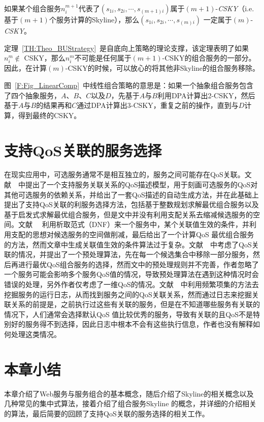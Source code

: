 \begin{theorem}[自底向上策略]\label{TH:Theo_BUStrategy}
如果某个组合服务$n_{i}^{m+1}$代表了$(s_{1i},s_{2i},\cdots,s_{(m+1)i})$属于$(m+1)$-\emph{CSKY}（i.e. 基于$(m+1)$个服务计算的Skyline），那么$(s_{1i},s_{2i},\cdots,s_{(m)i})$ 一定属于$(m)$-\emph{CSKY}。
\end{theorem}

定理~\ref{TH:Theo_BUStrategy}~是自底向上策略的理论支撑，该定理表明了如果$n_{i}^{m} \notin$ CSKY，那么$n_{i}^{m}$不可能是任何属于$(m+1)$-CSKY的组合服务的一部分。因此，在计算$(m)$-CSKY的时候，可以放心的将其他非Skyline的组合服务移除。

图~\ref{F:Fig_LinearComp}~中线性组合策略的意思是：如果一个抽象组合服务包含了四个抽象服务，$A$、$B$、$C$以及$D$，先基于$A$与$B$利用DPA计算出2-CSKY，然后基于$A$与$B$的结果再和$C$通过DPA计算出3-CSKY，重复之前的操作，直到与$D$计算，得到最终的CSKY。

\section{支持QoS关联的服务选择}

在现实应用中，可选服务通常不是相互独立的，服务之间可能存在QoS关联。文献~\cite{ye2008service}~中提出了一个支持服务关联关系的QoS描述模型，用于刻画可选服务的QoS对其他可选服务的依赖关系，并给出了一套QoS描述的自动生成方法，并在此基础上提出了支持QoS关联的利服务选择方法，包括基于整数规划求解最优组合服务以及基于启发式求解最优组合服务，但是文中并没有利用支配关系去缩减候选服务的空间。文献~\cite{barakat2012efficient}~ 利用析取范式（DNF）来一个服务中，某个关联值生效的条件，并利用支配的思想对候选服务的空间做削减，最后给出了一个计算QoS 最优组合服务的方法，然而文章中生成关联值生效的条件算法过于复杂。文献~\cite{deng2014service}~中考虑了QoS关联的情况，并提出了一个预处理算法，先在每一个候选集合中移除一部分服务，然后再进行最优QoS组合服务的选择，然而文中的预处理规则并不完善，作者忽略了一个服务可能会影响多个服务QoS值的情况，导致预处理算法在遇到这种情况时会错误的处理，另外作者仅考虑了一维QoS的情况。文献~\cite{zhang2014correlation}~中利用频繁项集的方法去挖掘服务的运行日志，从而找到服务之间的QoS关联关系，然而通过日志来挖掘关联关系的前提是，之前执行过这些有关联的服务，但是在不知道哪些服务有关联的情况下，人们通常会选择默认QoS 值比较优秀的服务，导致有关联的且QoS不是特别好的服务得不到选择，因此日志中根本不会有这些执行信息，作者也没有解释如何处理这类情况。

\section{本章小结}

本章介绍了Web服务与服务组合的基本概念，随后介绍了Skyline的相关概念以及几种常见的集中式算法，接着介绍了组合服务Skyline 的概念，并详细的介绍相关的算法，最后简要的回顾了支持QoS关联的服务选择的相关工作。

